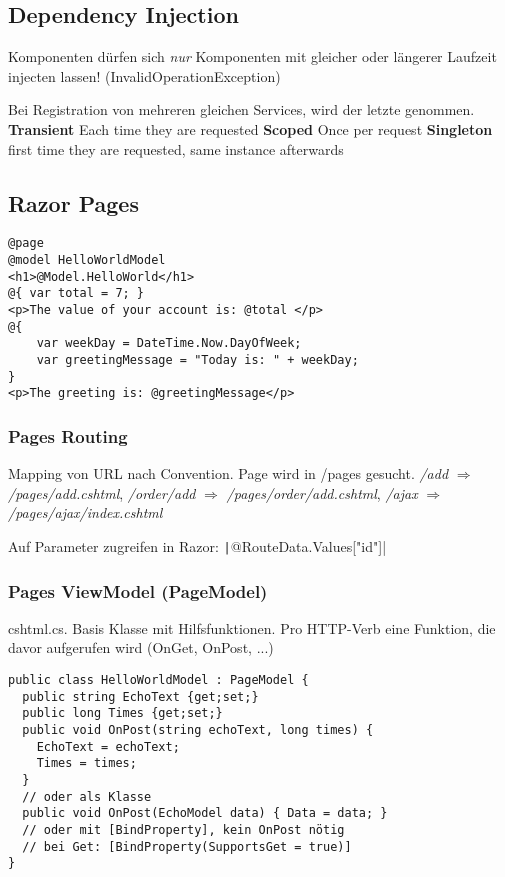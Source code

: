 \begin{multicols*}{2}
\subsection{Dependency Injection}
Komponenten dürfen sich \textit{nur} Komponenten mit gleicher oder längerer Laufzeit injecten lassen! (InvalidOperationException)

Bei Registration von mehreren gleichen Services, wird der letzte genommen.
\textbf{Transient} Each time they are requested \textbf{Scoped} Once per request \textbf{Singleton} first time they are requested, same instance afterwards

\subsection{Razor Pages}
\begin{verbatim}
@page
@model HelloWorldModel
<h1>@Model.HelloWorld</h1>
@{ var total = 7; }
<p>The value of your account is: @total </p>
@{
    var weekDay = DateTime.Now.DayOfWeek;
    var greetingMessage = "Today is: " + weekDay;
}
<p>The greeting is: @greetingMessage</p>
\end{verbatim}

\subsubsection{Pages Routing}
Mapping von URL nach Convention. Page wird in /pages gesucht.
\textit{/add} \(\Rightarrow\) \textit{/pages/add.cshtml}, \textit{/order/add} \(\Rightarrow\) \textit{/pages/order/add.cshtml}, \textit{/ajax} \(\Rightarrow\) \textit{/pages/ajax/index.cshtml}

Auf Parameter zugreifen in Razor: \texttt|@RouteData.Values["id"]|

\subsubsection{Pages ViewModel (PageModel)}
cshtml.cs. Basis Klasse mit Hilfsfunktionen. Pro HTTP-Verb eine Funktion, die davor aufgerufen wird (OnGet, OnPost, ...)

\begin{verbatim}
public class HelloWorldModel : PageModel {
  public string EchoText {get;set;}
  public long Times {get;set;}
  public void OnPost(string echoText, long times) {
    EchoText = echoText;
    Times = times;
  }
  // oder als Klasse
  public void OnPost(EchoModel data) { Data = data; }
  // oder mit [BindProperty], kein OnPost nötig
  // bei Get: [BindProperty(SupportsGet = true)]
}
\end{verbatim}


\end{multicols*}
